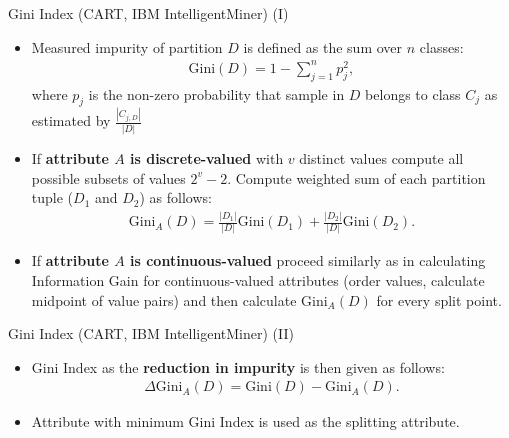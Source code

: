 \begin{frame}{Gini Index (CART, IBM IntelligentMiner) (I)}
	\begin{itemize}
		\item Measured impurity of partition $D$ is defined as the sum over $n$ classes:
		      \begin{align*}
			      \text{Gini}(D) = 1-\sum_{j=1}^{n} p_j^2,
		      \end{align*}
		      where $p_j$ is the non-zero probability that sample in $D$ belongs to class $C_j$ as estimated by $\frac{|C_{j,D}|}{|D|}$
		\item If \textbf{attribute $A$ is discrete-valued} with $v$ distinct values
		      compute all possible subsets of values $2^v - 2$. Compute weighted sum of
		      each partition tuple ($D_1$ and $D_2$) as follows:
		      \begin{align*}
			      \text{Gini}_A(D) = \frac{|D_1|}{|D|}\text{Gini}(D_1)+\frac{|D_2|}{|D|}\text{Gini}(D_2).
		      \end{align*}
		\item If \textbf{attribute $A$ is continuous-valued} proceed similarly as in
		      calculating Information Gain for continuous-valued attributes (order values,
		      calculate midpoint of value pairs) and then calculate $\text{Gini}_A(D)$ for
		      every split point.
	\end{itemize}
\end{frame}

\begin{frame}{Gini Index (CART, IBM IntelligentMiner) (II)}
	\begin{itemize}
		\item Gini Index as the \textbf{reduction in impurity} is then given as
		      follows:
		      \begin{align*}
			      \Delta\text{Gini}_A(D) = \text{Gini}(D)-\text{Gini}_A(D).
		      \end{align*}
		\item Attribute with minimum Gini Index is used as the splitting attribute.
	\end{itemize}

\end{frame}

